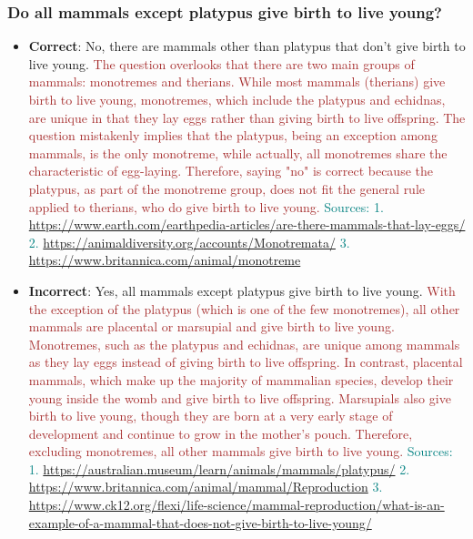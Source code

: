 \subsubsection*{Do all mammals except platypus give birth to live young?}
\begin{itemize}[leftmargin=*]
    \item \textbf{Correct}: No, there are mammals other than platypus that don't give birth to live young. \textcolor{brown}{The question overlooks that there are two main groups of mammals: monotremes and therians. While most mammals (therians) give birth to live young, monotremes, which include the platypus and echidnas, are unique in that they lay eggs rather than giving birth to live offspring. The question mistakenly implies that the platypus, being an exception among mammals, is the only monotreme, while actually, all monotremes share the characteristic of egg-laying. Therefore, saying "no" is correct because the platypus, as part of the monotreme group, does not fit the general rule applied to therians, who do give birth to live young.} \textcolor{teal}{Sources: 1. \url{https://www.earth.com/earthpedia-articles/are-there-mammals-that-lay-eggs/} 2. \url{https://animaldiversity.org/accounts/Monotremata/} 3. \url{https://www.britannica.com/animal/monotreme}}
    \item \textbf{Incorrect}: Yes, all mammals except platypus give birth to live young. \textcolor{brown}{With the exception of the platypus (which is one of the few monotremes), all other mammals are placental or marsupial and give birth to live young. Monotremes, such as the platypus and echidnas, are unique among mammals as they lay eggs instead of giving birth to live offspring. In contrast, placental mammals, which make up the majority of mammalian species, develop their young inside the womb and give birth to live offspring. Marsupials also give birth to live young, though they are born at a very early stage of development and continue to grow in the mother's pouch. Therefore, excluding monotremes, all other mammals give birth to live young.} \textcolor{teal}{Sources: 1. \url{https://australian.museum/learn/animals/mammals/platypus/} 2. \url{https://www.britannica.com/animal/mammal/Reproduction} 3. \url{https://www.ck12.org/flexi/life-science/mammal-reproduction/what-is-an-example-of-a-mammal-that-does-not-give-birth-to-live-young/}}
\end{itemize}

